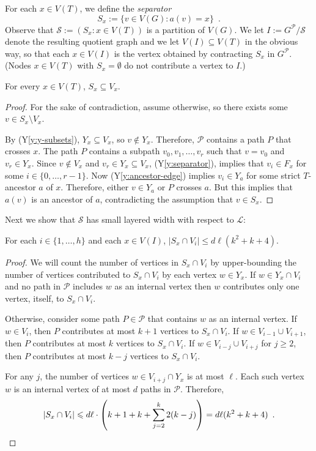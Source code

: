 \documentclass{patmorin}
\newcommand{\yref}[1]{(Y\ref{y:#1})}
\renewcommand{\ge}{\geqslant}
\renewcommand{\le}{\leqslant}
\begin{document}
For each $x\in V(T)$, we define the \emph{separator}
\[  
     S_x := \{v\in V(G): a(v)= x\} \enspace .
\]
Observe that $\mathcal{S}:=(S_x : x\in V(T))$ is a partition of $V(G)$.  We let $I:=G^\mathcal{P}/\mathcal{S}$ denote the resulting quotient graph and we let $V(I)\subseteq V(T)$ in the obvious way, so that each $x\in V(I)$ is the vertex obtained by contracting $S_x$ in $G^{\mathcal{P}}$. (Nodes $x\in V(T)$ with $S_x=\emptyset$ do not contribute a vertex to $I$.)

\begin{clm}
  For every $x\in V(T)$, $S_x\subseteq V_x$.
\end{clm}

\begin{proof}
  For the sake of contradiction, assume otherwise, so there exists some $v\in S_x\setminus V_x$.
  
  By \yref{y-subsets}, $Y_x\subseteq V_x$, so $v\not\in Y_x$.  Therefore, $\mathcal{P}$ contains a path $P$ that crosses $x$.  The path $P$ contains a subpath $v_0,v_1,\ldots,v_{r}$ such that $v=v_0$ and $v_r\in Y_x$. Since $v\not\in V_x$ and $v_r\in Y_x\subseteq V_x$, \yref{separator}, implies that $v_i\in F_x$ for some $i\in\{0,\ldots,r-1\}$. Now \yref{ancestor-edge} implies $v_i\in Y_a$ for some strict $T$-ancestor $a$ of $x$.  Therefore, either $v\in Y_a$ or $P$ crosses $a$. But this implies that $a(v)$ is an ancestor of $a$, contradicting the assumption that $v\in S_x$.
\end{proof}

Next we show that $\mathcal{S}$ has small layered width with respect to $\mathcal{L}$:

\begin{clm}
  For each $i\in\{1,\ldots,h\}$ and each $x\in V(I)$, $|S_x\cap V_i|\le d\ell(k^2+k+4)$.  
\end{clm}

\begin{proof}
  We will count the number of vertices in $S_x\cap V_i$ by upper-bounding the number of vertices contributed to $S_x\cap V_i$ by each vertex $w\in Y_x$.
  If $w\in Y_x\cap V_i$ and no path in $\mathcal{P}$ includes $w$ as an internal vertex then $w$ contributes only one vertex, itself, to $S_x\cap V_i$.
  
  Otherwise, consider some path $P\in\mathcal{P}$ that contains $w$ as an internal vertex.  If $w\in V_{i}$, then $P$ contributes at most $k+1$ vertices to $S_x\cap V_i$.  If $w\in V_{i-1}\cup V_{i+1}$, then $P$ contributes at most $k$ vertices to $S_x\cap V_i$. If $w\in V_{i-j}\cup V_{i+j}$ for $j\ge 2$, then $P$ contributes at most $k-j$ vertices to $S_x\cap V_i$.
  
  For any $j$, the number of vertices $w\in V_{i+j}\cap Y_x$ is at most $\ell$. Each such vertex $w$ is an internal vertex of at most $d$ paths in $\mathcal{P}$. Therefore, 
  \[  |S_x\cap V_i|\le d\ell\cdot\left(k+1 + k + \sum_{j=2}^k 2(k-j)\right) %
      = d\ell(k^2 +k + 4) \enspace . \qedhere
  \]
\end{proof}
\end{document}
